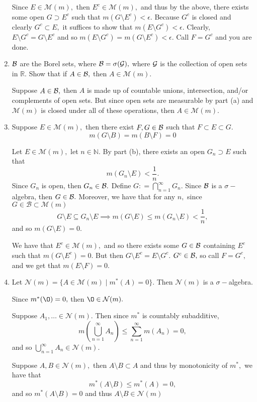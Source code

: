 \documentclass[11pt]{article}
\newcommand{\bbN}{\mathbb{N}}
\newcommand{\bbR}{\mathbb{R}}
\renewcommand{\emptyset}{\O}
\newcommand{\sm}{\setminus}
\begin{document}
\begin{problem}
\begin{enumerate}
\begin{solution}
        Since $E \in \mathcal{M}(m),$ then $E^c \in \mathcal{M}(m),$ and thus by the above, there exists some open $G\supset E^c$ such that $m(G \setminus E^c) < \epsilon.$ Because $G^c$ is closed and clearly $G^c \subset E,$ it suffices to show that $m(E \setminus G^c) < \epsilon.$ Clearly, $E\setminus G^c = G\setminus E^c$ and so $m(E\sm G^c) = m(G \sm E^c) < \epsilon.$ Call $F = G^c$ and you are done.
    \end{solution}
    \item 
    $\cal B$ are the Borel sets, where $\mathcal{B} = \sigma(\cal G),$ where $\cal G$ is the collection of open sets in $\bbR.$ Show that if $A \in \cal B,$ then $A\in \mathcal{M}(m).$
    \begin{solution}
        Suppose $A \in \cal B,$ then $A$ is made up of countable unions, intersection, and/or complements of open sets. But since open sets are measurable by part (a) and $\mathcal{M}(m)$ is closed under all of these operations, then $A \in \mathcal{M}(m).$ 
    \end{solution}
    \item  Suppose $E \in \mathcal{M}(m),$ then there exist $F,G \in \cal B$ such that $F \subset E \subset G.$
    \[m(G\sm B) = m(B\sm F) = 0\]
    \begin{solution}
        Let $E \in \mathcal{M}(m),$ let $n \in \bbN.$ By part (b), there exists an open $G_n\supset E$ such that \[m(G_n \sm E) < \frac{1}{n}.\] Since $G_n$ is open, then $G_n \in \cal B.$ Define $G: = \bigcap_{n=1}^\infty G_n.$ Since $\cal B$ is a $\sigma-$algebra, then $G \in \cal B.$ Moreover, we have that for any $n,$ since $G \in \mathcal{B} \subset \mathcal{M}(m)$
        \[G \sm E \subseteq G_n \sm E \implies m(G \sm E) \leq m(G_n \sm E)< \frac{1}{n},\] and so $m(G \sm E) = 0.$ 

        We have that $E^c \in \mathcal{M}(m),$ and so there exists some $G\in \cal B$ containing $E^c$ such that $m(G\sm E^c) = 0.$ But then $G\sm E^c = E\sm G^c.$ $G^c \in \cal B,$ so call $F = G^c,$ and we get that $m(E \sm F) = 0.$
    \end{solution}
    \item Let $\mathcal{N}(m) = \{A \in \mathcal{M}(m) \mid m^*(A) = 0\}.$ Then $\mathcal{N}(m)$ is a $\sigma-$algebra.
    \begin{solution}
        Since $m^*(\emptyset) = 0,$ then $\emptyset \in \mathcal{N}(m).$

        Suppose $A_1, \dots \in \mathcal{N}(m).$ Then since $m^*$ is countably subadditive, 
        \[m(\bigcup_{n=1}^\infty A_n) \leq \sum_{n=1}^\infty m(A_n) = 0,\] and so $\bigcup_{n=1}^\infty A_n \in \mathcal{N}(m).$

        Suppose $A,B \in \mathcal{N}(m),$ then $A\sm B \subset A$ and thus by monotonicity of $m^*,$ we have that 
        \[m^*(A \sm B) \leq m^*(A) = 0,\] and so $m^*(A\sm B) =  0$ and thus $A\sm B \in \mathcal{N}(m)$
    \end{solution}
    \end{enumerate}

\end{problem}
\end{document}
